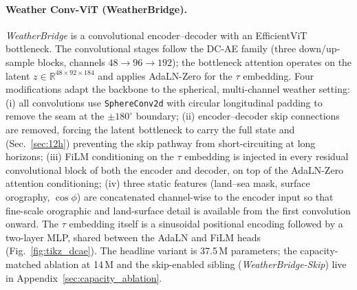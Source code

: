 \documentclass[10pt,letterpaper,twocolumn]{article}
\begin{document}
\paragraph{Weather Conv-ViT (WeatherBridge).}
\emph{WeatherBridge} is a convolutional encoder--decoder with an
EfficientViT \cite{cai2024dcae} bottleneck. The convolutional stages
follow the DC-AE \cite{xie2024dcae} family (three down/up-sample
blocks, channels $48 \to 96 \to 192$); the bottleneck attention
operates on the latent $z \in \mathbb{R}^{48 \times 92 \times 184}$
and applies AdaLN-Zero \cite{peebles2023dit,esser2024sd3} for the
$\tau$ embedding. Four modifications adapt the backbone to the
spherical, multi-channel weather setting:
(i) all convolutions use \texttt{SphereConv2d} with circular
longitudinal padding to remove the seam at the $\pm 180^\circ$
boundary; (ii) encoder--decoder skip connections are removed, forcing
the latent bottleneck to carry the full state and (Sec.~\ref{sec:12h})
preventing the skip pathway from short-circuiting at long horizons;
(iii) FiLM \cite{peebles2023dit} conditioning on the $\tau$ embedding
is injected in every residual convolutional block of both the encoder
and decoder, on top of the AdaLN-Zero attention conditioning; (iv) three
static features (land--sea mask, surface orography, $\cos\phi$) are
concatenated channel-wise to the encoder input so that fine-scale
orographic and land-surface detail is available from the first
convolution onward. The $\tau$ embedding itself is
a sinusoidal positional encoding followed by a two-layer MLP, shared
between the AdaLN and FiLM heads (Fig.~\ref{fig:tikz_dcae}).
The headline variant is 37.5\,M parameters; the capacity-matched
ablation at 14\,M and the skip-enabled sibling
(\emph{WeatherBridge-Skip}) live in Appendix~\ref{sec:capacity_ablation}.
\end{document}
